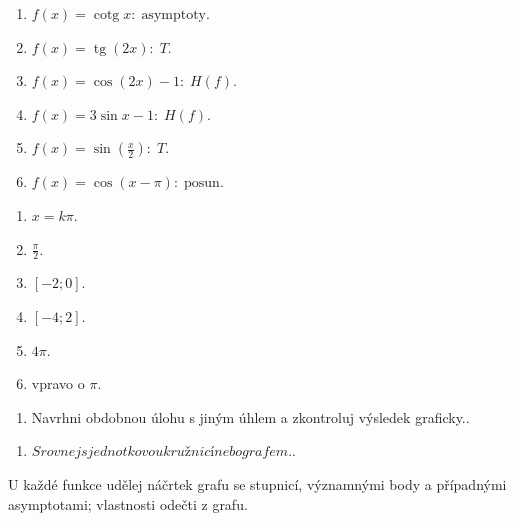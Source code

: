 \documentclass[11pt,a4paper]{article}
\begin{document}
\begin{zadaniReseniBox}[title={Samostatná práce 1}]
\begin{enumerate}[label=\alph*)]
\item $f(x)=\operatorname{cotg}x:\;\text{asymptoty}$.
\item $f(x)=\operatorname{tg}(2x):\;T$.
\item $f(x)=\cos(2x)-1:\;H(f)$.
\item $f(x)=3\sin x-1:\;H(f)$.
\item $f(x)=\sin(\frac x2):\;T$.
\item $f(x)=\cos(x-\pi):\;\text{posun}$.
\end{enumerate}
\tcblower
\begin{enumerate}[label=\alph*)]
\item $x=k\pi$.
\item $\frac{\pi}{2}$.
\item $[-2;0]$.
\item $[-4;2]$.
\item $4\pi$.
\item vpravo o $\pi$.
\end{enumerate}
\end{zadaniReseniBox}
\begin{zadaniReseniBox}[title={Rozšíření 1}]
\begin{enumerate}[label=\alph*)]
\item Navrhni obdobnou úlohu s jiným úhlem a zkontroluj výsledek graficky..
\end{enumerate}
\tcblower
\begin{enumerate}[label=\alph*)]
\item $Srovnej s jednotkovou kružnicí nebo grafem.$.
\end{enumerate}
\end{zadaniReseniBox}
U každé funkce udělej náčrtek grafu se stupnicí, významnými body a případnými asymptotami; vlastnosti odečti z grafu.
\end{document}
